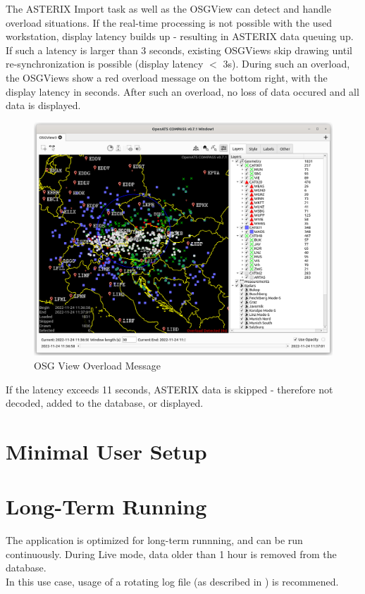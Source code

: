 The ASTERIX Import task as well as the OSGView can detect and handle overload situations. If the real-time processing is not possible with the used workstation, display latency builds up - resulting in ASTERIX data queuing up. \\

If such a latency is larger than 3 seconds,  existing OSGViews skip drawing until re-synchronization is possible (display latency $<$ 3s). During such an overload, the OSGViews show a red overload message on the bottom right, with the display latency in seconds. After such an overload, no loss of data occured and all data is displayed. \\


\begin{figure}[H]
    \hspace*{-2.5cm}
    \includegraphics[width=19cm,frame]{figures/osgview_overload.png}
  \caption{OSG View Overload Message}
\end{figure} 

If the latency exceeds 11 seconds, ASTERIX data is skipped - therefore not decoded, added to the database, or displayed.

\section{Minimal User Setup}




\section{Long-Term Running}

The application is optimized for long-term runnning, and can be run continuously. During Live mode, data older than 1 hour is removed from the database. \\

In this use case, usage of a rotating log file (as described in ) is recommened.






